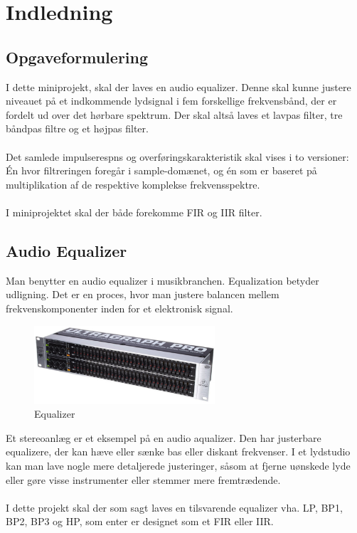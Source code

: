 \chapter{Indledning}

\section{Opgaveformulering}
I dette miniprojekt, skal der laves  en audio equalizer. Denne skal kunne justere niveauet på et indkommende lydsignal i fem forskellige frekvensbånd, der er fordelt ud over det hørbare spektrum. Der skal altså laves et lavpas filter, tre båndpas filtre og et højpas filter. 
\\ \\
Det samlede impulserespns og overføringskarakteristik skal vises i to versioner: Én hvor filtreringen foregår i sample-domænet, og én som er baseret på multiplikation af de respektive komplekse frekvensspektre. 
\\ \\
I miniprojektet skal der både forekomme FIR og IIR filter. 


\section{Audio Equalizer}
Man benytter en audio equalizer i musikbranchen. Equalization betyder udligning. Det er en proces, hvor man justere balancen mellem frekvenskomponenter inden for et elektronisk signal. 

\begin{figure}
	\centering
	\includegraphics[width=0.6\textwidth]{Figur/Snip20151111_60}
	\caption{Equalizer}
\end{figure}

Et stereoanlæg er et eksempel på en audio aqualizer. Den har justerbare equalizere, der kan hæve eller sænke bas eller diskant frekvenser.
I et lydstudio kan man lave nogle mere detaljerede justeringer, såsom at fjerne uønskede lyde eller gøre visse instrumenter eller stemmer mere fremtrædende.
\\ \\
I dette projekt skal der som sagt laves en tilsvarende equalizer vha. LP, BP1, BP2, BP3 og HP, som enter er designet som et FIR eller IIR. 

